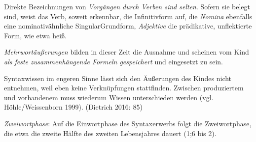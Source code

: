 \documentclass[
  letterpaper,
]{scrbook}
\begin{document}
Direkte Bezeichnungen von \emph{Vorgängen durch Verben sind selten}.
Sofern sie belegt sind, weist das Verb, soweit erkennbar, die
Infinitivform auf, die \emph{Nomina} ebenfalls eine nominativähnliche
SingularGrundform, \emph{Adjektive} die prädikative, unflektierte Form,
wie etwa heiß.

\emph{Mehrwortäußerungen} bilden in dieser Zeit die Ausnahme und
scheinen vom Kind \emph{als feste zusammenhängende Formeln gespeichert}
und eingesetzt zu sein.

Syntaxwissen im engeren Sinne lässt sich den Äußerungen des Kindes nicht
entnehmen, weil eben keine Verknüpfungen stattfinden. Zwischen
produziertem und vorhandenem muss wiederum Wissen unterschieden werden
(vgl. Höhle/Weissenborn 1999). (Dietrich 2016: 85)

\emph{Zweiwortphase}: Auf die Einwortphase des Syntaxerwerbs folgt die
Zweiwortphase, die etwa die zweite Hälfte des zweiten Lebensjahres
dauert (1;6 bis 2).
\end{document}
